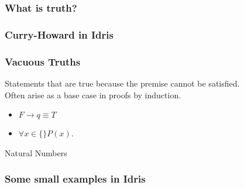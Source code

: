\documentclass{beamer}
\begin{document}
\begin{frame}
  \frametitle{What is truth?}
\end{frame}

\begin{frame}
  \frametitle{Curry-Howard in Idris}
\end{frame}


\begin{frame}
  \frametitle{Vacuous Truths}
  Statements that are true because the premise cannot be satisfied. \\
  Often arise as a base case in proofs by induction.
  \begin{itemize}
    \item $F \rightarrow q \equiv T$
    \item $\forall x \in \{\} P(x)$.
  \end{itemize}
\end{frame}

\begin{frame}{Natural Numbers}
\end{frame}

\begin{frame}
  \frametitle{Some small examples in Idris}
\end{frame}
\end{document}
